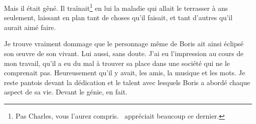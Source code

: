 Mais il était gêné. Il traînait\footnote{Pas Charles, vous l'aurez compris. \BV\ appréciait beaucoup ce dernier.}
en lui la maladie qui allait le terrasser à  ans seulement, laissant en plan tant de choses qu'il faisait,
et tant d'autres qu'il aurait aimé faire.

Je trouve vraiment dommage que le personnage même de Boris ait ainsi éclipsé
son \oe{}uvre de son vivant. Lui aussi, sans doute. J'ai eu l'impression au cours
de mon travail, qu'il a eu du mal à trouver sa place dans une société qui
ne le comprenait pas. Heureusement qu'il y avait, les amis, la musique et les mots.
Je reste pantois devant la dédication et le talent avec lesquels Boris a abordé
chaque aspect de sa vie. Devant le génie, en fait.

